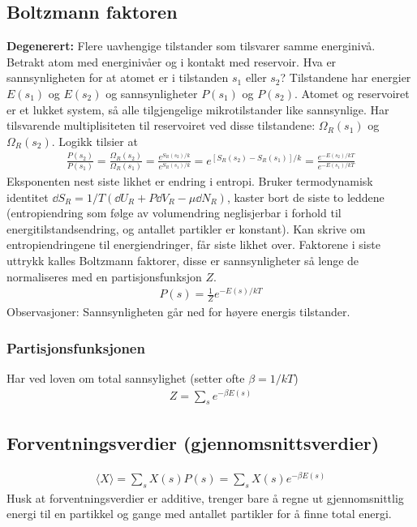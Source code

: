 \documentclass[12pt]{article}
\newcommand{\mean}[1]{\langle #1 \rangle}
\begin{document}
\subsection{Boltzmann faktoren}
\textbf{Degenerert:} Flere uavhengige tilstander som tilsvarer samme energinivå.
Betrakt atom med energinivåer og i kontakt med reservoir. Hva er sannsynligheten
for at atomet er i tilstanden $s_1$ eller $s_2$? Tilstandene har energier $E(s_1)$
og $E(s_2)$ og sannsynligheter $P(s_1)$ og $P(s_2)$. Atomet og reservoiret er
et lukket system, så alle tilgjengelige mikrotilstander like sannsynlige. Har tilsvarende
multiplisiteten til reservoiret ved disse tilstandene: $\Omega_R(s_1)$ og $\Omega_R(s_2)$.
Logikk tilsier at
\begin{align*}
  \frac{P(s_2)}{P(s_1)} = \frac{\Omega_R(s_2)}{\Omega_R(s_1)} = \frac{e^{S_R(s_2)/k}}{e^{S_R(s_1)/k}} = e^{[S_R(s_2) - S_R(s_1)]/k} = \frac{e^{-E(s_2)/kT}}{e^{-E(s_1)/kT}}
\end{align*}
Eksponenten  nest siste likhet er endring i entropi. Bruker termodynamisk identitet $\dd S_R = 1/T (\dd U_R + P \dd V_R - \mu \dd N_R)$,
kaster bort de siste to leddene (entropiendring som følge av volumendring neglisjerbar i forhold til energitilstandsendring, og
antallet partikler er konstant). Kan skrive om entropiendringene til energiendringer, får siste likhet over. Faktorene i siste
uttrykk kalles Boltzmann faktorer, disse er sannsynligheter så lenge de normaliseres med en partisjonsfunksjon $Z$.
\begin{align*}
  P(s) = \frac{1}{Z} e^{-E(s)/kT}
\end{align*}
Observasjoner: Sannsynligheten går ned for høyere energis tilstander.
\subsubsection{Partisjonsfunksjonen}
Har ved loven om total sannsylighet (setter ofte $\beta = 1 / kT$)
\begin{align*}
  Z = \sum_s e^{-\beta E(s)}
\end{align*}
\subsection{Forventningsverdier (gjennomsnittsverdier)}
\begin{align*}
  \mean{X} = \sum_s X(s) P(s) = \sum_s X(s) e^{-\beta E(s)}
\end{align*}
Husk at forventningsverdier er additive, trenger bare å regne ut gjennomsnittlig
energi til en partikkel og gange med antallet partikler for å finne total energi.
\end{document}
